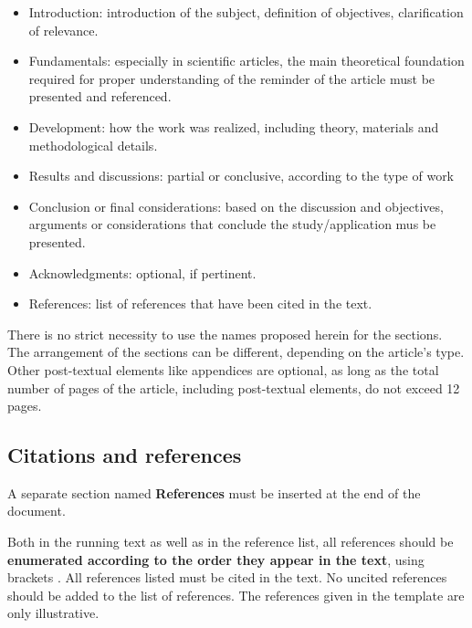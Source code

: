 \documentclass[12pt, a4paper, twoside, twocolumn]{article}
\begin{document}
\begin{itemize}[noitemsep,topsep=0ex] \itemsep=3pt
    \item Introduction: introduction of the subject, definition of objectives, clarification of relevance.
    \item Fundamentals: especially in scientific articles, the main theoretical foundation required for proper understanding of the reminder of the article must be presented and referenced.
    \item Development: how the work was realized, including theory, materials and methodological details.
    \item Results and discussions: partial or conclusive, according to the type of work
    \item Conclusion or final considerations: based on the discussion and objectives, arguments or considerations that conclude the study/application mus be presented.
    \item Acknowledgments: optional, if pertinent.
    \item References: list of references that have been cited in the text.
\end{itemize}

There is no strict necessity to use the names proposed herein for the sections. The arrangement of the sections can be different, depending on the article's type. Other post-textual elements like appendices are optional, as long as the total number of pages of the article, including post-textual elements, do not exceed 12 pages.

\subsection{Citations and references}

A separate section named \textbf{References}  must be inserted at the end of the document.

Both in the running text as well as in the reference list, all references should be \textbf{enumerated according to the  order they appear in the text}, using brackets \cite{Gomes-2015}. All references listed must be cited in the text. No uncited references should be added to the list of references. The references given in the template \cite{Mareze-2017,Fonseca-2013,Brandao-2017,Gomes-2015,Oppenheim-2010,Muller-2001,Mareze-2019,Borges-2018,Ristow-2016} are only illustrative.
\end{document}
